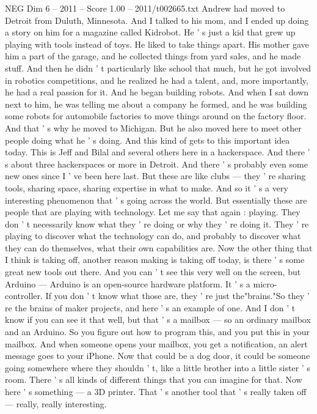 \begin{textsample}{NEG Dim 6 – 2011 – Score 1.00 – 2011/t002665.txt}
Andrew had moved to Detroit from Duluth, Minnesota.
And I talked to his mom, and I ended up doing a story on him for a magazine called Kidrobot.
He ' s just a kid that grew up playing with tools instead of toys.
He liked to take things apart.
His mother gave him a part of the garage, and he collected things from yard sales, and he made stuff.
And then he didn ' t particularly like school that much, but he got involved in robotics competitions, and he realized he had a talent, and, more importantly, he had a real passion for it.
And he began building robots.
And when I sat down next to him, he was telling me about a company he formed, and he was building some robots for automobile factories to move things around on the factory floor.
And that ' s why he moved to Michigan.
But he also moved here to meet other people doing what he ' s doing.
And this kind of gets to this important idea today.
This is Jeff and Bilal and several others here in a hackerspace.
And there ' s about three hackerspaces or more in Detroit.
And there ' s probably even some new ones since I ' ve been here last.
But these are like clubs — they ' re sharing tools, sharing space, sharing expertise in what to make.
And so it ' s a very interesting phenomenon that ' s going across the world.
But essentially these are people that are playing with technology.
Let me say that again : playing.
They don ' t necessarily know what they ' re doing or why they ' re doing it.
They ' re playing to discover what the technology can do, and probably to discover what they can do themselves, what their own capabilities are.
Now the other thing that I think is taking off, another reason making is taking off today, is there ' s some great new tools out there.
And you can ' t see this very well on the screen, but Arduino — Arduino is an open-source hardware platform.
It ' s a micro-controller.
If you don ' t know what those are, they ' re just the"brains."So they ' re the brains of maker projects, and here ' s an example of one.
And I don ' t know if you can see it that well, but that ' s a mailbox — so an ordinary mailbox and an Arduino.
So you figure out how to program this, and you put this in your mailbox.
And when someone opens your mailbox, you get a notification, an alert message goes to your iPhone.
Now that could be a dog door, it could be someone going somewhere where they shouldn ' t, like a little brother into a little sister ' s room.
There ' s all kinds of different things that you can imagine for that.
Now here ' s something — a 3D printer.
That ' s another tool that ' s really taken off — really, really interesting.

\end{textsample}
